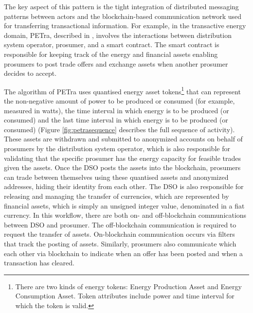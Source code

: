 The key aspect of this pattern is the tight integration of distributed  messaging patterns between actors and the blockchain-based communication network used for transferring transactional information. For example, in the transactive energy domain,  PETra, described in \cite{Laszka17}, involves the interactions between distribution system operator, prosumer, and a smart contract. The smart contract is  responsible for keeping track of the energy and financial assets enabling prosumers to post trade offers and exchange assets when another prosumer decides to accept.


The  algorithm of PETra uses quantised energy asset tokens\footnote{There are two kinds of energy tokens: Energy Production Asset and Energy Consumption Asset. Token attributes include power and time interval for which the token is valid.} that can represent the non-negative amount of power to be produced or consumed (for example, measured in watts),  the time interval in which energy is to be produced (or consumed) and the  last time interval in which energy is to be produced (or consumed) (Figure \ref{fig:petrasequence} describes the full sequence of activity). These assets are withdrawn and submitted to anonymized accounts on behalf of prosumers by the distribution system operator, which is also responsible for validating that the specific prosumer has the  energy capacity for feasible trades given the assets. Once the DSO posts the assets into the blockchain, prosumers can trade between themselves using these quantised assets and anonymized addresses, hiding their identity from each other. The DSO is also responsible for releasing and managing the transfer of currencies, which are represented by financial assets, which is  simply an unsigned integer value, denominated in a fiat currency. In this workflow, there are both on- and off-blockchain communications between DSO and prosumer. The off-blockchain communication is required to request the transfer of assets. On-blockchain communication occurs via filters that track the posting of assets. Similarly, prosumers also communicate which each other via blockchain to indicate when an offer has been posted and when a transaction has cleared. 

